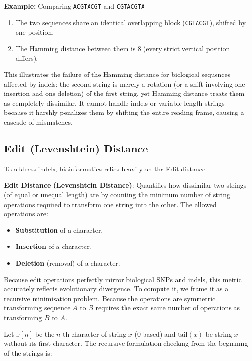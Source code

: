 \textbf{Example:}
Comparing \texttt{ACGTACGT} and \texttt{CGTACGTA}
\begin{enumerate}
    \item The two sequences share an identical overlapping block (\texttt{CGTACGT}), shifted by one position.
    \item The Hamming distance between them is 8 (every strict vertical position differs).
\end{enumerate}
This illustrates the failure of the Hamming distance for biological sequences affected by indels: the second string is merely a rotation (or a shift involving one insertion and one deletion) of the first string, yet Hamming distance treats them as completely dissimilar. It cannot handle indels or variable-length strings because it harshly penalizes them by shifting the entire reading frame, causing a cascade of mismatches.

\subsection{Edit (Levenshtein) Distance}

To address indels, bioinformatics relies heavily on the Edit distance.

\begin{important}
    \textbf{Edit Distance (Levenshtein Distance)}: Quantifies how dissimilar two strings (of equal or unequal length) are by counting the minimum number of string operations required to transform one string into the other. The allowed operations are:
    \begin{itemize}
        \item \textbf{Substitution} of a character.
        \item \textbf{Insertion} of a character.
        \item \textbf{Deletion} (removal) of a character.
    \end{itemize}
\end{important}

Because edit operations perfectly mirror biological SNPs and indels, this metric accurately reflects evolutionary divergence. To compute it, we frame it as a recursive minimization problem. Because the operations are symmetric, transforming sequence \(A\) to \(B\) requires the exact same number of operations as transforming \(B\) to \(A\).

Let $x[n]$ be the $n$-th character of string $x$ (0-based) and $\text{tail}(x)$ be string $x$ without its first character. The recursive formulation checking from the beginning of the strings is:

